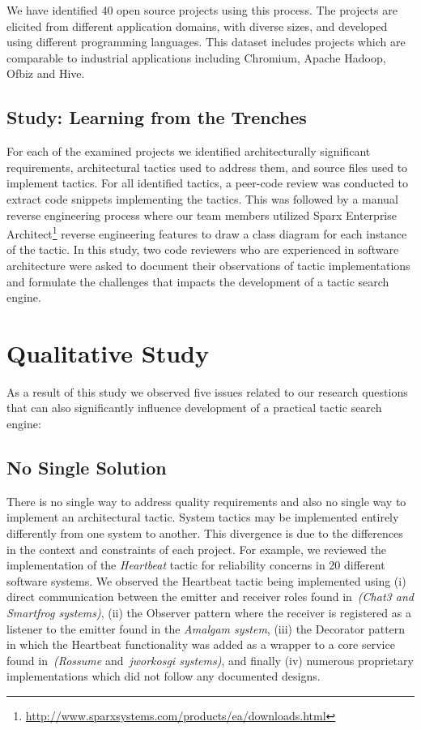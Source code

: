 We have identified 40 open source projects using this process. The projects are elicited from different application domains, with diverse sizes, and developed using different programming languages. This dataset includes projects which are comparable to industrial applications including Chromium, Apache Hadoop, Ofbiz and Hive.

\subsection{Study: Learning from the Trenches}
For each of the examined projects we identified architecturally significant requirements, architectural tactics used to address them, and source files used to implement tactics. For all identified tactics, a peer-code review was conducted to extract code snippets implementing the tactics. This was followed by a manual reverse engineering process where our team members utilized Sparx Enterprise Architect\footnote{\url{http://www.sparxsystems.com/products/ea/downloads.html}} reverse engineering features to draw a class diagram for each instance of the tactic. In this study, two code reviewers who are experienced in software architecture were asked to document their observations of tactic implementations and formulate the challenges that impacts the development of a tactic search engine.

\section{Qualitative Study}
\label{sec:SeenUnSeen}
As a result of this study we observed five issues related to our research questions that can also significantly influence development of a practical tactic search engine:

\subsection{No Single Solution}
There is no single way to address quality requirements and also no single way to implement an architectural tactic. System tactics may be implemented entirely differently from one system to another. This divergence is due to the differences in the context and constraints of each project. For example, we reviewed the implementation of the \emph{Heartbeat} tactic for reliability concerns in 20 different software systems. We observed the Heartbeat tactic being implemented using (i) direct communication between the emitter and receiver roles found in~\emph{(Chat3 and Smartfrog systems)}, (ii) the Observer pattern where the receiver is registered as a listener to the emitter found in the \emph{Amalgam system}, (iii) the Decorator pattern in which the Heartbeat functionality was added as a wrapper to a core service found in~\emph{(Rossume} and~\emph{jworkosgi systems)}, and finally (iv) numerous proprietary implementations which did not follow any documented designs.

